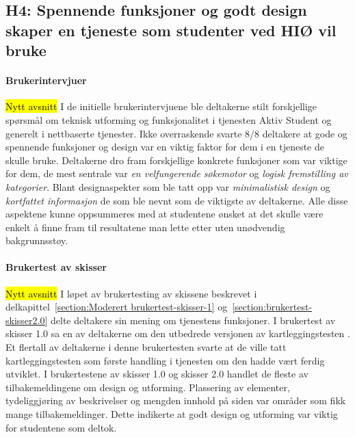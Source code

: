 \subsection{H4: Spennende funksjoner og godt design skaper en tjeneste som studenter ved HIØ vil bruke}

\paragraph{Brukerintervjuer}
\hl{Nytt avsnitt}
I de initielle brukerintervjuene ble deltakerne stilt forskjellige spørsmål om teknisk utforming og funksjonalitet i tjenesten Aktiv Student og generelt i nettbaserte tjenester. Ikke overraskende svarte 8/8 deltakere at gode og spennende funksjoner og design var en viktig faktor for dem i en tjeneste de skulle bruke. Deltakerne dro fram forskjellige konkrete funksjoner som var viktige for dem, de mest sentrale var {\em en velfungerende søkemotor} og {\em logisk fremstilling av kategorier}. Blant designaspekter som ble tatt opp var {\em minimalistisk design} og {\em kortfattet informasjon} de som ble nevnt som de viktigste av deltakerne. Alle disse aspektene kunne oppsummeres med at studentene ønsket at det skulle være enkelt å finne fram til resultatene man lette etter uten unødvendig bakgrunnsstøy.

\paragraph{Brukertest av skisser}
\hl{Nytt avsnitt}
I løpet av brukertesting av skissene beskrevet i delkapittel~\ref{section:Moderert brukertest-skisser-1} og~\ref{section:brukertest-skisser2.0} delte deltakere sin mening om tjenestens funksjoner. I brukertest av skisser 1.0 sa en av deltakerne om den utbedrede versjonen av kartleggingstesten . Et flertall av deltakerne i denne brukertesten svarte at de ville tatt kartleggingstesten som første handling i tjenesten om den hadde vært ferdig utviklet. I brukertestene av skisser 1.0 og skisser 2.0 handlet de fleste av tilbakemeldingene om design og utforming. Plassering av elementer, tydeliggjøring av beskrivelser og mengden innhold på siden var områder som fikk mange tilbakemeldinger. Dette indikerte at godt design og utforming var viktig for studentene som deltok.

